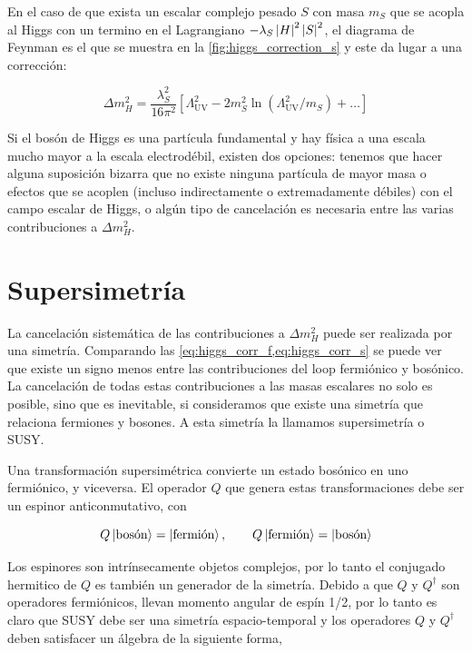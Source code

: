 En el caso de que exista un escalar complejo pesado $S$ con masa $m_S$ que se
acopla al Higgs con un termino en el Lagrangiano $-\lambda_S \left| H \right|^2
\left| S \right|^2$, el diagrama de Feynman es el que se muestra en la
\cref{fig:higgs_correction_s} y este da lugar a una corrección:

\begin{equation}
  \Delta m_H^2 = \frac{\lambda_S^2}{16\pi^2} \left[ \Lambda^2_\text{UV} - 2
    m_S^2 \ln (\Lambda^2_\text{UV}/m_S) + \ldots \right]
  \label{eq:higgs_corr_s}
\end{equation}

Si el bosón de Higgs es una partícula fundamental y hay física a una escala
mucho mayor a la escala electrodébil, existen dos opciones: tenemos que hacer
alguna suposición bizarra que no existe ninguna partícula de mayor masa o
efectos que se acoplen (incluso indirectamente o extremadamente débiles) con el
campo escalar de Higgs, o algún tipo de cancelación es necesaria entre las
varias contribuciones a $\Delta m_H^2$.

\section{Supersimetría}

La cancelación sistemática de las contribuciones a $\Delta m_H^2$ puede ser
realizada por una simetría. Comparando las
\cref{eq:higgs_corr_f,eq:higgs_corr_s} se puede ver que existe un signo menos
entre las contribuciones del loop fermiónico y bosónico. La cancelación de todas
estas contribuciones a las masas escalares no solo es posible, sino que es
inevitable, si consideramos que existe una simetría que relaciona fermiones y
bosones. A esta simetría la llamamos supersimetría o SUSY.

Una transformación supersimétrica convierte un estado bosónico en uno
fermiónico, y viceversa. El operador $Q$ que genera estas transformaciones debe
ser un espinor anticonmutativo, con

\begin{equation}
  Q \left| \text{bosón} \right> = \left| \text{fermión} \right>, \quad \quad Q
  \left| \text{fermión} \right> = \left| \text{bosón} \right>
\end{equation}

Los espinores son intrínsecamente objetos complejos, por lo tanto el conjugado
hermitico de $Q$ es también un generador de la simetría. Debido a que $Q$ y
$Q^\dagger$ son operadores fermiónicos, llevan momento angular de espín 1/2, por
lo tanto es claro que SUSY debe ser una simetría espacio-temporal y los
operadores $Q$ y $Q^\dagger$ deben satisfacer un álgebra de la siguiente forma,

